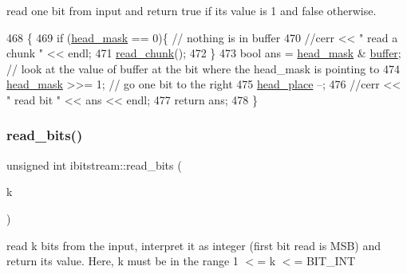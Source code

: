 read one bit from input and return true if its value is 1 and false otherwise. 


\begin{DoxyCode}
468                          \{
469   \textcolor{keywordflow}{if} (\hyperlink{classibitstream_a48cd41991b6c29ea5120b53873a72a70}{head\_mask} == 0)\{ \textcolor{comment}{// nothing is in buffer}
470     \textcolor{comment}{//cerr << " read a chunk " << endl;}
471     \hyperlink{classibitstream_ac62c26004436d83f337f4aeba0895e20}{read\_chunk}();
472   \}
473   \textcolor{keywordtype}{bool} ans = \hyperlink{classibitstream_a48cd41991b6c29ea5120b53873a72a70}{head\_mask} & \hyperlink{classibitstream_a73f0b24d3d4402369f1abbb43f7f70ef}{buffer}; \textcolor{comment}{// look at the value of buffer at the bit where the
       head\_mask is pointing to}
474   \hyperlink{classibitstream_a48cd41991b6c29ea5120b53873a72a70}{head\_mask} >>= 1; \textcolor{comment}{// go one bit to the right}
475   \hyperlink{classibitstream_a7b96359ac1534a5565e6e9b0cc53a0b3}{head\_place} --;
476   \textcolor{comment}{//cerr << " read bit " << ans << endl;}
477   \textcolor{keywordflow}{return} ans;
478 \}
\end{DoxyCode}
\mbox{\label{classibitstream_a2fdcaecf10fefa6942dcd5286a2696e0}} 
\subsubsection{\texorpdfstring{read\+\_\+bits()}{read\_bits()}\hspace{0.1cm}{\footnotesize\ttfamily [1/2]}}
{\footnotesize\ttfamily unsigned int ibitstream\+::read\+\_\+bits (\begin{DoxyParamCaption}\item[{unsigned int}]{k }\end{DoxyParamCaption})}



read k bits from the input, interpret it as integer (first bit read is M\+SB) and return its value. Here, k must be in the range 1 $<$= k $<$= B\+I\+T\+\_\+\+I\+NT 


